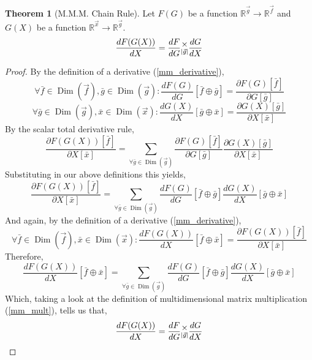 \documentclass[12pt]{article}
\theoremstyle{definition}
\newtheorem{theorem}{Theorem}[section]
\theoremstyle{case}
\theoremstyle{ppart}
\DeclareMathOperator{\Dim}{Dim}
\newcommand{\mmult}[1]{\text{\raisebox{1ex}{$\underset{#1}{\times}$}}}
\begin{document}
\begin{theorem}[M.M.M. Chain Rule]
\label{mmm_chain_rule}
Let $F(G)$ be a function $\mathbb{R}^{\vec{g}} \rightarrow \mathbb{R}^{\vec{f}}$
and $G(X)$ be a function $\mathbb{R}^{\vec{x}} \rightarrow \mathbb{R}^{\vec{g}}$.
\[
\frac{dF(G(X))}{dX} = \frac{dF}{dG} \mmult{|\vec{g}|} \frac{dG}{dX}
\]
\end{theorem}
\begin{proof}
By the definition of a derivative (\ref{mm_derivative}),
\[
\forall \bar{f} \in \Dim(\vec{f}), \bar{g} \in \Dim(\vec{g}):
\frac{dF(G)}{dG}[\bar{f} \oplus \bar{g}]
= \frac{\partial F(G)[\bar{f}]}{\partial G[\bar{g}]}
\]
\[
\forall \bar{g} \in \Dim(\vec{g}), \bar{x} \in \Dim(\vec{x}):
\frac{dG(X)}{dX}[\bar{g} \oplus \bar{x}]
= \frac{\partial G(X)[\bar{g}]}{\partial X[\bar{x}]}
\]
By the scalar total derivative rule,
\[
\frac{\partial F(G(X))[\bar{f}]}{\partial X[\bar{x}]}
= \sum_{\forall \bar{g} \in \Dim(\vec{g})} 
\frac{\partial F(G)[\bar{f}]}{\partial G[\bar{g}]}
\frac{\partial G(X)[\bar{g}]}{\partial X[\bar{x}]}
\]
Substituting in our above definitions this yields,
\[
\frac{\partial F(G(X))[\bar{f}]}{\partial X[\bar{x}]}
= \sum_{\forall \bar{g} \in \Dim(\vec{g})} 
\frac{dF(G)}{dG}[\bar{f} \oplus \bar{g}]
\frac{dG(X)}{dX}[\bar{g} \oplus \bar{x}]
\]
And again, by the definition of a derivative (\ref{mm_derivative}),
\[
\forall \bar{f} \in \Dim(\vec{f}), \bar{x} \in \Dim(\vec{x}):
\frac{dF(G(X))}{dX}[\bar{f} \oplus \bar{x}]
= \frac{\partial F(G(X))[\bar{f}]}{\partial X[\bar{x}]}
\]
Therefore,
\[
\frac{dF(G(X))}{dX}[\bar{f} \oplus \bar{x}]
= \sum_{\forall \bar{g} \in \Dim(\vec{g})} 
\frac{dF(G)}{dG}[\bar{f} \oplus \bar{g}]
\frac{dG(X)}{dX}[\bar{g} \oplus \bar{x}]
\]
Which, taking a look at the definition of multidimensional matrix multiplication
(\ref{mm_mult}), tells us that,
\[
\frac{dF(G(X))}{dX} = \frac{dF}{dG} \mmult{|\vec{g}|} \frac{dG}{dX}
\]
\end{proof}
\end{document}
